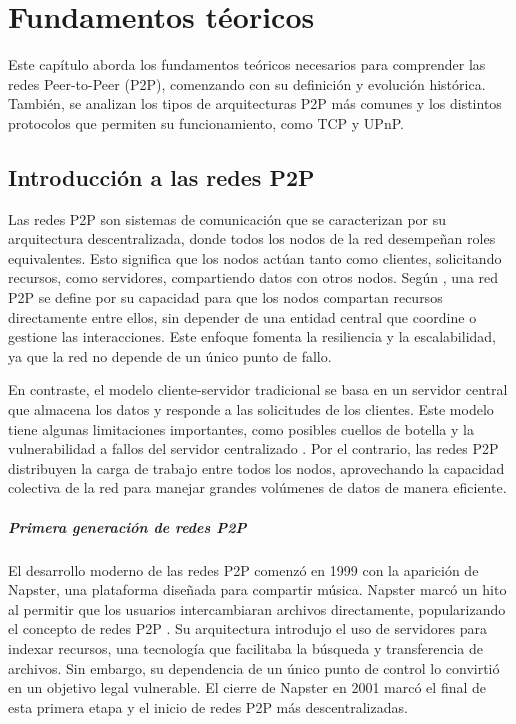 \chapter{Fundamentos t\'eoricos}
\label{cap:fundamentosTeoricos}

Este capítulo aborda los fundamentos teóricos necesarios para comprender las redes Peer-to-Peer (P2P), comenzando con su definición y evolución histórica.
También, se analizan los tipos de arquitecturas P2P más comunes y los distintos protocolos que permiten su funcionamiento, como TCP y UPnP.

\section{Introducción a las redes P2P}
Las redes P2P son sistemas de comunicación que se caracterizan por su arquitectura descentralizada, donde todos los nodos de la red desempeñan roles equivalentes.
Esto significa que los nodos actúan tanto como clientes, solicitando recursos, como servidores, compartiendo datos con otros nodos.
Según \cite{schollmeier2001}, una red P2P se define por su capacidad para que los nodos compartan recursos directamente entre ellos, sin depender de una entidad central que coordine o gestione las interacciones.
Este enfoque fomenta la resiliencia y la escalabilidad, ya que la red no depende de un único punto de fallo.

En contraste, el modelo cliente-servidor tradicional se basa en un servidor central que almacena los datos y responde a las solicitudes de los clientes.
Este modelo tiene algunas limitaciones importantes, como posibles cuellos de botella y la vulnerabilidad a fallos del servidor centralizado \cite{coulouris2011}.
Por el contrario, las redes P2P distribuyen la carga de trabajo entre todos los nodos, aprovechando la capacidad colectiva de la red para manejar grandes volúmenes de datos de manera eficiente.

\paragraph{Primera generación de redes P2P}

El desarrollo moderno de las redes P2P comenzó en 1999 con la aparición de Napster, una plataforma diseñada para compartir música.
Napster marcó un hito al permitir que los usuarios intercambiaran archivos directamente, popularizando el concepto de redes P2P \cite{oram2001}.
Su arquitectura introdujo el uso de servidores para indexar recursos, una tecnología que facilitaba la búsqueda y transferencia de archivos.
Sin embargo, su dependencia de un único punto de control lo convirtió en un objetivo legal vulnerable.
El cierre de Napster en 2001 marcó el final de esta primera etapa y el inicio de redes P2P más descentralizadas.

